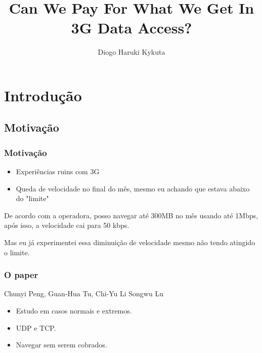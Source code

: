 \documentclass[brazil]{beamer}
\title{Can We Pay For What We Get In 3G Data Access?}
\author{Diogo Haruki Kykuta}
\date{}
\begin{document}
\frame{\titlepage}

\section{Introdução}

\subsection{Motivação}

\begin{frame}[fragile]
    \frametitle{Motivação}
    \begin{itemize}
        \item Experiências ruins com 3G
        \item Queda de velocidade no final do mês, mesmo eu achando que estava abaixo do "limite"
    \end{itemize}
\end{frame}

\begin{frame}[fragile]
    De acordo com a operadora, posso navegar até 300MB no mês usando até 1Mbps, após isso, a velocidade cai
    para 50 kbps.
    \pause

    Mas eu já experimentei essa diminuição de velocidade mesmo não tendo atingido o limite.
\end{frame}

\begin{frame}[fragile]
    \frametitle{O paper}
    \begin{center}
        Chunyi Peng, Guan-Hua Tu, Chi-Yu Li Songwu Lu
    \end{center}
    \vspace{1cm}
    \begin{itemize}
        \item Estudo em casos normais e extremos.
        \item UDP e TCP.
        \item Navegar sem serem cobrados.

    \end{itemize}
\end{frame}
\end{document}

